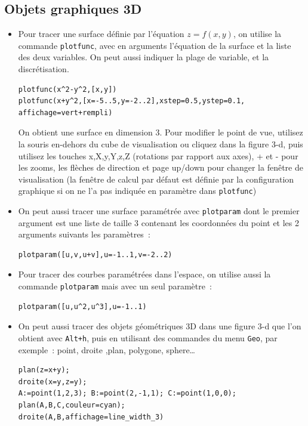 \documentclass{article}
\begin{document}
\subsection{Objets graphiques 3D}
%
\begin{itemize}
\item Pour tracer une surface d\'efinie par l'\'equation
$z=f(x,y)$, on utilise la commande \verb|plotfunc|, avec
en arguments l'\'equation de la surface et la liste des deux variables.
On peut aussi indiquer la plage de variable, et la discr\'etisation.
\begin{verbatim}
plotfunc(x^2-y^2,[x,y])
plotfunc(x+y^2,[x=-5..5,y=-2..2],xstep=0.5,ystep=0.1,
affichage=vert+rempli)
\end{verbatim}
On obtient une surface en dimension 3.
Pour modifier le point de vue, utilisez la souris en-dehors du cube de visualisation
ou cliquez dans la figure 3-d, puis
utilisez les touches x,X,y,Y,z,Z (rotations par rapport aux axes), 
+ et - pour les zooms, 
les fl\`eches de direction et page up/down pour changer la
fen\^etre de visualisation (la fen\^etre de calcul par d\'efaut est 
d\'efinie par la configuration graphique si on ne l'a pas indiqu\'ee
en param\`etre dans \verb|plotfunc|)
\item On peut aussi tracer une surface param\'etr\'ee
avec \verb|plotparam| dont le premier
argument est une liste de taille 3 contenant les coordonn\'ees du point
et les 2 arguments suivants les param\`etres~:
\begin{verbatim}
plotparam([u,v,u+v],u=-1..1,v=-2..2)
\end{verbatim}
\item Pour tracer des courbes param\'etr\'ees dans l'espace, on utilise
aussi la commande \verb|plotparam| mais avec un seul param\`etre~:
\begin{verbatim}
plotparam([u,u^2,u^3],u=-1..1)
\end{verbatim}
\item On peut aussi tracer des objets g\'eom\'etriques 3D dans une figure 3-d que l'on 
obtient avec {\tt Alt+h}, puis en utilisant des commandes du menu \verb|Geo|, par exemple~:
point, droite ,plan, polygone, sphere\ldots
\begin{verbatim}
plan(z=x+y);
droite(x=y,z=y);
A:=point(1,2,3); B:=point(2,-1,1); C:=point(1,0,0);
plan(A,B,C,couleur=cyan);
droite(A,B,affichage=line_width_3)
\end{verbatim}
\end{itemize}
\end{document}
